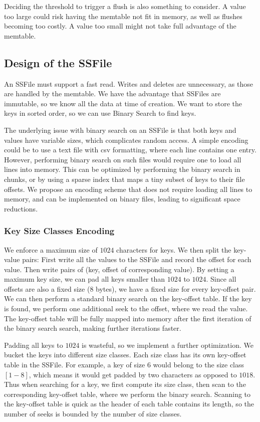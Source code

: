 \documentclass[10pt]{extarticle}
\begin{document}
Deciding the threshold to trigger a flush is also something to consider. A value too large could risk having the memtable not fit in memory, as well as flushes becoming too costly. A value too small might not take full advantage of the memtable.

\subsection{Design of the SSFile}
An SSFile must support a fast read. Writes and deletes are unnecessary, as those are handled by the memtable. We have the advantage that SSFiles are immutable, so we know all the data at time of creation. We want to store the keys in sorted order, so we can use Binary Search to find keys. 
    
The underlying issue with binary search on an SSFile is that both keys and values have variable sizes, which complicates random access. A simple encoding could be to use a text file with csv formatting, where each line contains one entry. However, performing binary search on such files would require one to load all lines into memory. This can be optimized by performing the binary search in chunks, or by using a sparse index that maps a tiny subset of keys to their file offsets. We propose an encoding scheme that does not require loading all lines to memory, and can be implemented on binary files, leading to significant space reductions. 

\subsubsection{Key Size Classes Encoding}

We enforce a maximum size of $1024$ characters for keys. We then split the key-value pairs: First write all the values to the SSFile and record the offset for each value. Then write pairs of (key, offset of corresponding value). By setting a maximum key size, we can pad all keys smaller than $1024$ to $1024$. Since all offsets are also a fixed size (8 bytes), we have a fixed size for every key-offset pair. We can then perform a standard binary search on the key-offset table. If the key is found, we perform one additional seek to the offset, where we read the value. The key-offset table will be fully mapped into memory after the first iteration of the binary search search, making further iterations faster.

Padding all keys to $1024$ is wasteful, so we implement a further optimization. We bucket the keys into different size classes. Each size class has its own key-offset table in the SSFile. For example, a key of size $6$ would belong to the size class $[1-8]$, which means it would get padded by two characters as opposed to $1018$. Thus when searching for a key, we first compute its size class, then scan to the corresponding key-offset table, where we perform the binary search. Scanning to the key-offset table is quick as the header of each table contains its length, so the number of seeks is bounded by the number of size classes.
\end{document}
